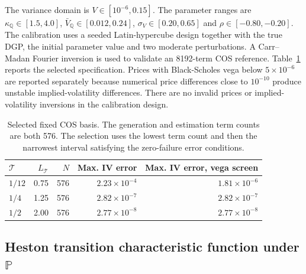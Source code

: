 \documentclass[11pt,a4paper,notitlepage]{article}
\numberwithin{equation}{section}
\begin{document}
The variance domain is \(V\in[10^{-6},0.15]\). The parameter ranges are \(\kappa_{\mathbb Q}\in[1.5,4.0]\), \(\bar V_{\mathbb Q}\in[0.012,0.24]\), \(\sigma_V\in[0.20,0.65]\) and \(\rho\in[-0.80,-0.20]\). The calibration uses a seeded Latin-hypercube design together with the true DGP, the initial parameter value and two moderate perturbations. A Carr--Madan Fourier inversion is used to validate an 8192-term COS reference. Table~\ref{tab:app_fixed_cos_calibration} reports the selected specification. Prices with Black-Scholes vega below \(5\times10^{-6}\) are reported separately because numerical price differences close to \(10^{-10}\) produce unstable implied-volatility differences. There are no invalid prices or implied-volatility inversions in the calibration design.

\begin{table}[H]
\centering
\begin{tabular}{lrrrr}
\toprule
\(\mathcal T\) & \(L_{\mathcal T}\) & \(N\) & Max. IV error & Max. IV error, vega screen \\
\midrule
\(1/12\) & 0.75 & 576 & \(2.23\times10^{-4}\) & \(1.81\times10^{-6}\) \\
\(1/4\)  & 1.25 & 576 & \(2.82\times10^{-7}\) & \(2.82\times10^{-7}\) \\
\(1/2\)  & 2.00 & 576 & \(2.77\times10^{-8}\) & \(2.77\times10^{-8}\) \\
\bottomrule
\end{tabular}
\caption{Selected fixed COS basis. The generation and estimation term counts are both 576. The selection uses the lowest term count and then the narrowest interval satisfying the zero-failure error conditions.}
\label{tab:app_fixed_cos_calibration}
\end{table}
\subsection{Heston transition characteristic function under \(\mathbb P\)}
\end{document}
